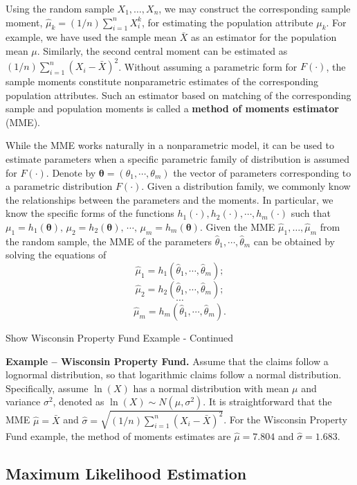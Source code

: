 \documentclass[]{book}
\theoremstyle{definition}
\theoremstyle{definition}
\theoremstyle{definition}
\theoremstyle{remark}
\begin{document}
Using the random sample \(X_1, \ldots, X_n\), we may construct the
corresponding sample moment, \(\hat{\mu}_k=(1/n)\sum_{i=1}^nX_i^k\), for
estimating the population attribute \(\mu_k\). For example, we have used
the sample mean \(\bar{X}\) as an estimator for the population mean
\(\mu\). Similarly, the second central moment can be estimated as
\((1/n)\sum_{i=1}^n(X_i-\bar{X})^2\). Without assuming a parametric form
for \(F(\cdot)\), the sample moments constitute nonparametric estimates
of the corresponding population attributes. Such an estimator based on
matching of the corresponding sample and population moments is called a
\textbf{method of moments estimator} (MME).

While the MME works naturally in a nonparametric model, it can be used
to estimate parameters when a specific parametric family of distribution
is assumed for \(F(\cdot)\). Denote by
\(\boldsymbol{\theta}=(\theta_1,\cdots,\theta_m)\) the vector of
parameters corresponding to a parametric distribution \(F(\cdot)\).
Given a distribution family, we commonly know the relationships between
the parameters and the moments. In particular, we know the specific
forms of the functions \(h_1(\cdot),h_2(\cdot),\cdots,h_m(\cdot)\) such
that
\(\mu_1=h_1(\boldsymbol{\theta}),\,\mu_2=h_2(\boldsymbol{\theta}),\,\cdots,\,\mu_m=h_m(\boldsymbol{\theta})\).
Given the MME \(\hat{\mu}_1, \ldots, \hat{\mu}_m\) from the random
sample, the MME of the parameters
\(\hat{\theta}_1,\cdots,\hat{\theta}_m\) can be obtained by solving the
equations of \[\hat{\mu}_1=h_1(\hat{\theta}_1,\cdots,\hat{\theta}_m);\]
\[\hat{\mu}_2=h_2(\hat{\theta}_1,\cdots,\hat{\theta}_m);\] \[\cdots\]
\[\hat{\mu}_m=h_m(\hat{\theta}_1,\cdots,\hat{\theta}_m).\]

Show Wisconsin Property Fund Example - Continued

\hypertarget{EXM:S1:MME}{}
\textbf{Example -- Wisconsin Property Fund.} Assume that the claims
follow a lognormal distribution, so that logarithmic claims follow a
normal distribution. Specifically, assume \(\ln(X)\) has a normal
distribution with mean \(\mu\) and variance \(\sigma^2\), denoted as
\(\ln(X) \sim N(\mu, \sigma^2)\). It is straightforward that the MME
\(\hat{\mu}=\bar{X}\) and
\(\hat{\sigma}=\sqrt{(1/n)\sum_{i=1}^n(X_i-\bar{X})^2}\). For the
Wisconsin Property Fund example, the method of moments estimates are
\(\hat{\mu} =7.804\) and \(\hat{\sigma} = 1.683\).

\subsection{Maximum Likelihood
Estimation}\label{maximum-likelihood-estimation}
\end{document}
